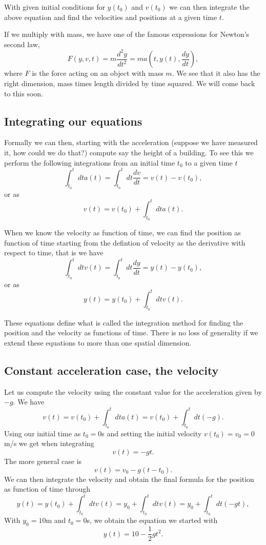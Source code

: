 \documentclass[%
oneside,                 %
final,                   %
10pt]{article}
\begin{document}
With given initial conditions for $y(t_0)$ and $v(t_0)$ we can then
integrate the above equation and find the velocities and positions at
a given time $t$.

If we multiply with mass, we have one of the famous expressions for Newton's second law,
\[
F(y,v,t)=m\frac{d^2y}{dt^2}=ma(t,y(t),\frac{dy}{dt}),
\]
where $F$ is the force acting on an object with mass $m$. We see that it also has the right dimension, mass times length divided by time squared.
We will come back to this soon.

\subsection*{Integrating our equations}

Formally we can then, starting with the acceleration (suppose we have measured it, how could we do that?)
compute say the height of a building.  To see this we perform the following integrations from an initial time $t_0$  to a given time $t$
\[
\int_{t_0}^t dt a(t) = \int_{t_0}^t dt \frac{dv}{dt} = v(t)-v(t_0),
\]
or as 
\[
v(t)=v(t_0)+\int_{t_0}^t dt a(t).
\]

When we know the velocity as function of time, we can find the position as function of time starting from the defintion of velocity as the derivative with respect to time, that is we have
\[
\int_{t_0}^t dt v(t) = \int_{t_0}^t dt \frac{dy}{dt} = y(t)-y(t_0),
\]
or as 
\[
y(t)=y(t_0)+\int_{t_0}^t dt v(t).
\]

These equations define what is called the integration method for
finding the position and the velocity as functions of time. There is
no loss of generality if we extend these equations to more than one
spatial dimension.

\subsection*{Constant acceleration case, the velocity}

Let us compute the velocity using the constant value for the acceleration given by $-g$. We have
\[
v(t)=v(t_0)+\int_{t_0}^t dt a(t)=v(t_0)+\int_{t_0}^t dt (-g).
\]
Using our initial time as $t_0=0$s and setting the initial velocity $v(t_0)=v_0=0$m/s we get when integrating
\[
v(t)=-gt.
\]
The more general case is
\[
v(t)=v_0-g(t-t_0).
\]
We can then integrate the velocity and obtain the final formula for the position as function of time through
\[
y(t)=y(t_0)+\int_{t_0}^t dt v(t)=y_0+\int_{t_0}^t dt v(t)=y_0+\int_{t_0}^t dt (-gt),
\]
With $y_0=10$m and $t_0=0$s, we obtain the equation we started with
\[
y(t)=10-\frac{1}{2}gt^2.
\]
\end{document}
